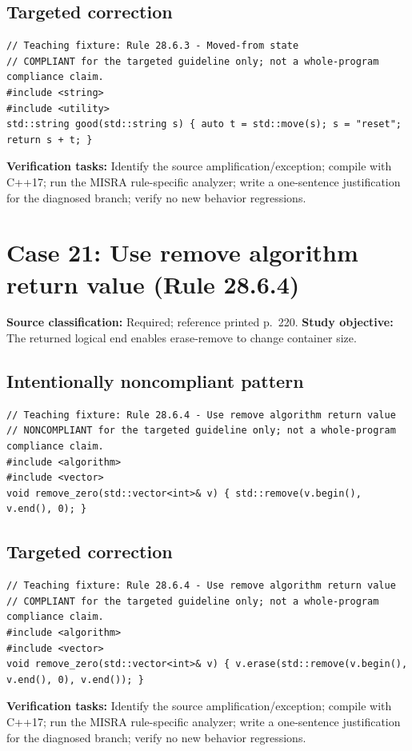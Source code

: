 \documentclass[10pt,letterpaper]{article}
\begin{document}
\subsection*{Targeted correction}
\begin{lstlisting}
// Teaching fixture: Rule 28.6.3 - Moved-from state
// COMPLIANT for the targeted guideline only; not a whole-program compliance claim.
#include <string>
#include <utility>
std::string good(std::string s) { auto t = std::move(s); s = "reset"; return s + t; }
\end{lstlisting}
\textbf{Verification tasks:} Identify the source amplification/exception; compile with C++17; run the MISRA rule-specific analyzer; write a one-sentence justification for the diagnosed branch; verify no new behavior regressions.

\section{Case 21: Use remove algorithm return value (Rule 28.6.4)}
\textbf{Source classification:} Required; reference printed p.~220. \textbf{Study objective:} The returned logical end enables erase-remove to change container size.
\subsection*{Intentionally noncompliant pattern}
\begin{lstlisting}
// Teaching fixture: Rule 28.6.4 - Use remove algorithm return value
// NONCOMPLIANT for the targeted guideline only; not a whole-program compliance claim.
#include <algorithm>
#include <vector>
void remove_zero(std::vector<int>& v) { std::remove(v.begin(), v.end(), 0); }
\end{lstlisting}
\subsection*{Targeted correction}
\begin{lstlisting}
// Teaching fixture: Rule 28.6.4 - Use remove algorithm return value
// COMPLIANT for the targeted guideline only; not a whole-program compliance claim.
#include <algorithm>
#include <vector>
void remove_zero(std::vector<int>& v) { v.erase(std::remove(v.begin(), v.end(), 0), v.end()); }
\end{lstlisting}
\textbf{Verification tasks:} Identify the source amplification/exception; compile with C++17; run the MISRA rule-specific analyzer; write a one-sentence justification for the diagnosed branch; verify no new behavior regressions.
\end{document}
